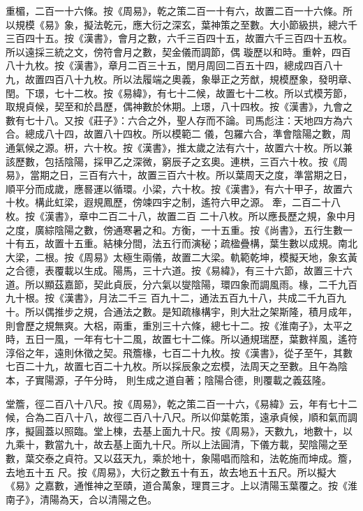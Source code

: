 \begin{pinyinscope}
 重楣，二百一十六條。按《周易》，乾之策二百一十有六，故置二百一十六條。所以規模《易》象，擬法乾元，應大衍之深玄，葉神策之至數。大小節級拱，總六千三百四十五。按《漢書》，會月之數，六千三百四十五，故置六千三百四十五枚。所以遠採三統之文，傍符會月之數，契金儀而調節，偶
 璇歷以和時。重幹，四百八十九枚。按《漢書》，章月二百三十五，閏月周回二百五十四，總成四百八十九，故置四百八十九枚。所以法履端之奧義，象舉正之芳猷，規模歷象，發明章、閏。下璟，七十二枚。按《易緯》，有七十二候，故置七十二枚。所以式模芳節，取規貞候，契至和於昌歷，偶神數於休期。上璟，八十四枚。按《漢書》，九會之數有七十八。又按《莊子》：六合之外，聖人存而不論。司馬彪注：天地四方為六合。總成八十四，故置八十四枚。所以模範二
 儀，包羅六合，準會陰陽之數，周通氣候之源。枅，六十枚。按《漢書》，推太歲之法有六十，故置六十枚。所以兼該歷數，包括陰陽，採甲乙之深微，窮辰子之玄奧。連栱，三百六十枚。按《周易》，當期之日，三百有六十，故置三百六十枚。所以葉周天之度，準當期之日，順平分而成歲，應晷運以循環。小梁，六十枚。按《漢書》，有六十甲子，故置六十枚。構此虹梁，遐規鳳歷，傍竦四宇之制，遙符六甲之源。牽，二百二十八枚。按《漢書》，章中二百二十八，故置二百
 二十八枚。所以應長歷之規，象中月之度，廣綜陰陽之數，傍通寒暑之和。方衡，一十五重。按《尚書》，五行生數一十有五，故置十五重。結棟分間，法五行而演秘；疏楹疊構，葉生數以成規。南北大梁，二根。按《周易》太極生兩儀，故置二大梁。軌範乾坤，模擬天地，象玄黃之合德，表覆載以生成。陽馬，三十六道。按《易緯》，有三十六節，故置三十六道。所以顯茲嘉節，契此貞辰，分六氣以燮陰陽，環四象而調風雨。椽，二千九百九十根。按《漢書》，月法二千三
 百九十二，通法五百九十八，共成二千九百九十。所以偶推步之規，合通法之數。是知疏椽構宇，則大壯之架斯隆，積月成年，則會歷之規無爽。大梠，兩重，重別三十六條，總七十二。按《淮南子》，太平之時，五日一風，一年有七十二風，故置七十二條。所以通規瑞歷，葉數祥風，遙符淳俗之年，遠則休徵之契。飛簷椽，七百二十九枚。按《漢書》，從子至午，其數七百二十九，故置七百二十九枚。所以採辰象之宏模，法周天之至數。且午為陰本，子實陽源，子午分時，
 則生成之道自著；陰陽合德，則覆載之義茲隆。



 堂簷，徑二百八十八尺。按《周易》，乾之策二百一十六，《易緯》云，年有七十二候，合為二百八十八，故徑二百八十八尺。所以仰葉乾策，遠承貞候，順和氣而調序，擬圓蓋以照臨。堂上棟，去基上面九十尺。按《周易》，天數九，地數十，以九乘十，數當九十，故去基上面九十尺。所以上法圓清，下儀方載，契陰陽之至數，葉交泰之貞符。又以茲天九，乘於地十，象陽唱而陰和，法乾施而坤成。簷，去地五十五
 尺。按《周易》，大衍之數五十有五，故去地五十五尺。所以擬大《易》之嘉數，通惟神之至賾，道合萬象，理貫三才。上以清陽玉葉覆之。按《淮南子》，清陽為天，合以清陽之色。




\end{pinyinscope}
